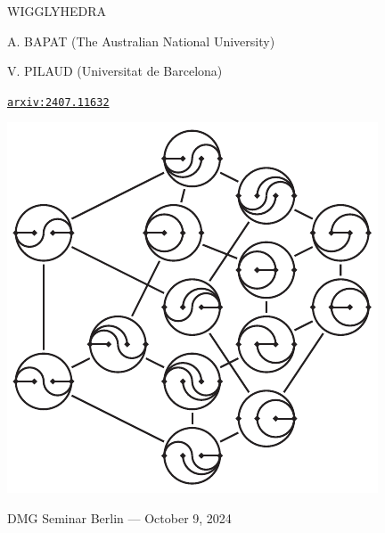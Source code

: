 \documentclass[12pt,titlepage,landscape,a4paper]{article}
\newcommand{\blue}{\color{blue}} %
\begin{document}
\fontsize{22}{28}\selectfont %
\sf
\pagestyle{empty} %

\vspace*{-1cm}
\begin{center}
{\blue \fontsize{60}{60}\selectfont
\uppercase{Wigglyhedra}

}

\vspace{.8cm}

A. BAPAT
(The Australian National University)

V. PILAUD
(Universitat de Barcelona)


\href{https://arxiv.org/abs/2407.11632}{\texttt{arxiv:2407.11632}}

\vspace{-.2cm}
\centerline{\includegraphics[scale=1.8]{wigglyFlipGraph}\quad{}}

\vspace{.1cm}
DMG Seminar Berlin --- October 9, 2024

\vspace*{-.6cm}

\end{center}
\end{document}
